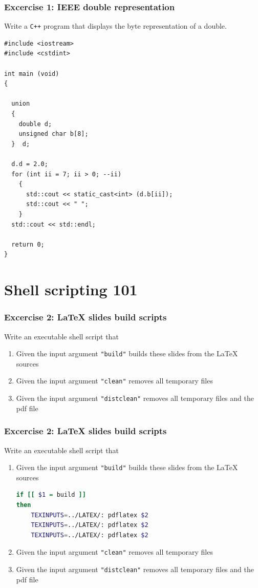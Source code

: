 \documentclass[10pt,c,ignorenonframetext]{beamer}
\begin{document}
\begin{frame}[fragile]
\frametitle{Excercise 1: IEEE double representation}

Write a {\tt C++} program that displays the byte 
representation of a double.

{\scriptsize
\begin{lstlisting}
#include <iostream>
#include <cstdint>

int main (void)
{

  union 
  {
    double d;
    unsigned char b[8];
  }  d;

  d.d = 2.0;
  for (int ii = 7; ii > 0; --ii)
    {      
      std::cout << static_cast<int> (d.b[ii]);
      std::cout << " ";
    }
  std::cout << std::endl;

  return 0;
}
\end{lstlisting}}
\end{frame}

\section{Shell scripting 101}

\begin{frame}[fragile]
\frametitle{Excercise 2: LaTeX slides build scripts}
Write an executable shell script that
\begin{enumerate}
\item Given the input argument {\tt "build"} builds these slides from the LaTeX sources
\item Given the input argument {\tt "clean"} removes all temporary files
\item Given the input argument {\tt "distclean"} removes all temporary files and the pdf file
\end{enumerate}
\end{frame}

\begin{frame}[fragile]
\frametitle{Excercise 2: LaTeX slides build scripts}
Write an executable shell script that
\begin{enumerate}
\item Given the input argument {\tt "build"} builds these slides from the LaTeX sources
{\tiny
\begin{lstlisting}[language=bash]
if [[ $1 = build ]]
then
    TEXINPUTS=../LATEX/: pdflatex $2
    TEXINPUTS=../LATEX/: pdflatex $2
    TEXINPUTS=../LATEX/: pdflatex $2
\end{lstlisting}}
\item Given the input argument {\tt "clean"} removes all temporary files
\item Given the input argument {\tt "distclean"} removes all temporary files and the pdf file
\end{enumerate}
\end{frame}
\end{document}
